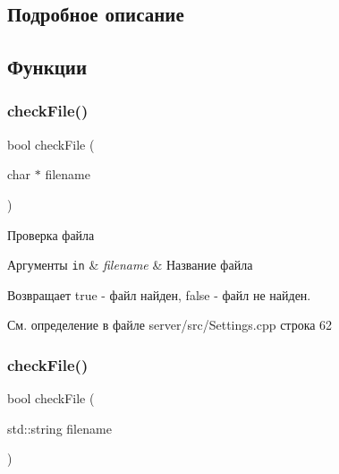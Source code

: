 \subsection{Подробное описание}


\subsection{Функции}
\mbox{\label{group__settingsh_ga2dd1bc039652a0480c444957d416b6a6}} 
\subsubsection{\texorpdfstring{check\+File()}{checkFile()}\hspace{0.1cm}{\footnotesize\ttfamily [1/2]}}
{\footnotesize\ttfamily bool check\+File (\begin{DoxyParamCaption}\item[{char $\ast$}]{filename }\end{DoxyParamCaption})}



Проверка файла 


\begin{DoxyParams}[1]{Аргументы}
\mbox{\tt in}  & {\em filename} & Название файла \\
\hline
\end{DoxyParams}
\begin{DoxyReturn}{Возвращает}
true -\/ файл найден, false -\/ файл не найден. 
\end{DoxyReturn}


См. определение в файле server/src/\+Settings.\+cpp строка 62

\mbox{\label{group__settingsh_ga147bed619c6314e960320c1bcb40ed91}} 
\subsubsection{\texorpdfstring{check\+File()}{checkFile()}\hspace{0.1cm}{\footnotesize\ttfamily [2/2]}}
{\footnotesize\ttfamily bool check\+File (\begin{DoxyParamCaption}\item[{std\+::string}]{filename }\end{DoxyParamCaption})}



